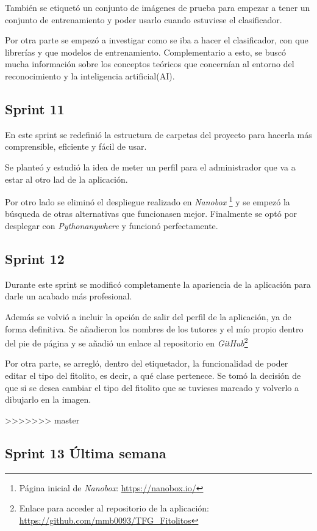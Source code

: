 También se etiquetó un conjunto de imágenes de prueba para empezar a tener un conjunto de entrenamiento y poder usarlo cuando estuviese el clasificador.

Por otra parte se empezó a investigar como se iba a hacer el clasificador, con que librerías y que modelos de entrenamiento. Complementario a esto, se buscó mucha información sobre los conceptos teóricos que concernían al entorno del reconocimiento y la inteligencia artificial(AI).


\subsection{Sprint 11}

En este sprint se redefinió la estructura de carpetas del proyecto para hacerla más comprensible, eficiente y fácil de usar.

Se planteó y estudió la idea de meter un perfil para el administrador que va a estar al otro lad de la aplicación.

Por otro lado se eliminó el despliegue realizado en \textit{Nanobox} \footnote{Página inicial de \textit{Nanobox}: \url{https://nanobox.io/} } y se empezó la búsqueda de otras alternativas que funcionasen mejor.
Finalmente se optó por desplegar con \textit{Pythonanywhere} y funcionó perfectamente.


\subsection{Sprint 12}

Durante este sprint se modificó completamente la apariencia de la aplicación para darle un acabado más profesional.

Además se volvió a incluir la opción de salir del perfil de la aplicación, ya de forma definitiva.
Se añadieron los nombres de los tutores y el mío propio dentro del pie de página y se añadió un enlace al repositorio en \textit{GitHub}\footnote{Enlace para acceder al repositorio de la aplicación: \url{https://github.com/mmb0093/TFG_Fitolitos}}

Por otra parte, se arregló, dentro del etiquetador, la funcionalidad de poder editar el tipo del fitolito, es decir, a qué clase pertenece. Se tomó la decisión de que si se desea cambiar el tipo del fitolito que se tuvieses marcado y  volverlo a dibujarlo en la imagen.

>>>>>>> master
\subsection{Sprint 13 Última semana}

